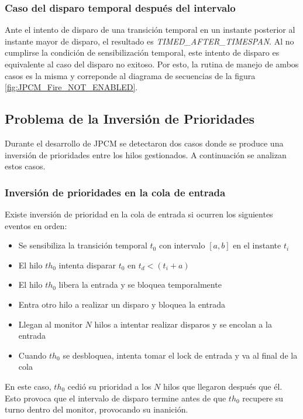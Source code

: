 \subsubsection*{Caso del disparo temporal después del intervalo}

Ante el intento de disparo de una transición temporal en un instante posterior
al instante mayor de disparo, el resultado es \textit{TIMED\_AFTER\_TIMESPAN}.
Al no cumplirse la condición de sensibilización temporal, este intento de
disparo es equivalente al caso del disparo no exitoso. Por esto, la rutina de
manejo de ambos casos es la misma y correponde al diagrama de secuencias de la
figura \ref{fig:JPCM_Fire_NOT_ENABLED}.

\subsection{Problema de la Inversión de Prioridades}
\label{sec:inversion_prioridad}
Durante el desarrollo de JPCM se detectaron dos casos donde se produce una
inversión de prioridades entre los hilos gestionados. A continuación se
analizan estos casos.

\subsubsection{Inversión de prioridades en la cola de entrada}
\label{inversion_prioridad_cola_entrada}
Existe inversión de prioridad en la cola de entrada si ocurren los siguientes
eventos en orden:
\begin{itemize}
  \item Se sensibiliza la transición temporal $t_{0}$ con intervalo $[a,b]$ en
  el instante $t_{i}$
  \item El hilo $th_{0}$ intenta disparar $t_{0}$ en $t_{d} < (t_{i} + a)$
  \item El hilo $th_{0}$ libera la entrada y se bloquea temporalmente
  \item Entra otro hilo a realizar un disparo y bloquea la entrada
  \item Llegan al monitor $N$ hilos a intentar realizar disparos y se encolan a
  la entrada
  \item Cuando $th_{0}$ se desbloquea, intenta tomar el lock de entrada y va al
  final de la cola
\end{itemize}

En este caso, $th_{0}$ cedió su prioridad a los $N$ hilos que llegaron después
que él. Esto provoca que el intervalo de disparo termine antes de que $th_{0}$
recupere su turno dentro del monitor, provocando su inanición.

